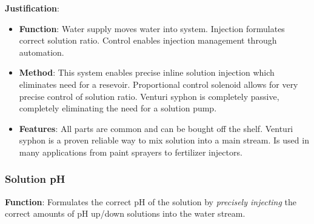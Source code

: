 \documentclass{report}
\begin{document}
\textbf{Justification}: 
\begin{itemize}
    \item \textbf{Function}: Water supply moves water into system. Injection formulates correct solution ratio. Control enables injection management through automation.
    \item \textbf{Method}: This system enables precise inline solution injection which eliminates need for a resevoir. Proportional control solenoid allows for very precise control of solution ratio. Venturi syphon is completely passive, completely eliminating the need for a solution pump. 
    \item \textbf{Features}: All parts are common and can be bought off the shelf. Venturi syphon is a proven reliable way to mix solution into a main stream. Is used in many applications from paint sprayers to fertilizer injectors.
\end{itemize}

\newpage


\subsubsection{Solution pH}
\label{sec:ph}

\textbf{Function}: Formulates the correct pH of the solution by \textit{precisely injecting} the correct amounts of pH up/down solutions into the water stream.
\end{document}

